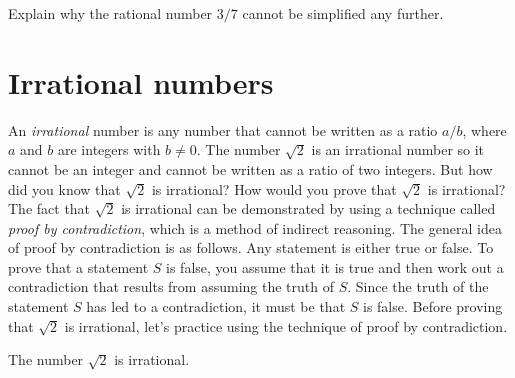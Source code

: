\documentclass[a4paper,oneside,12pt]{article}
\begin{document}
\begin{exercise}
Explain why the rational number $3/7$ cannot be simplified any
further.
\end{exercise}




\section{Irrational numbers}

An \emph{irrational} number is any number that cannot be written as a
ratio $a / b$, where $a$ and $b$ are integers with $b \neq 0$.  The
number $\sqrt{2}$ is an irrational number so it cannot be an integer
and cannot be written as a ratio of two integers.  But how did you
know that $\sqrt{2}$ is irrational?  How would you prove that
$\sqrt{2}$ is irrational?  The fact that $\sqrt{2}$ is irrational can
be demonstrated by using a technique called
\emph{proof by contradiction}, which is a method of indirect
reasoning.  The general idea of proof by contradiction is as follows.
Any statement is either true or false.  To prove that a statement $S$
is false, you assume that it is true and then work out a contradiction
that results from assuming the truth of $S$.  Since the truth of the
statement $S$ has led to a contradiction, it must be that $S$ is
false.  Before proving that $\sqrt{2}$ is irrational, let's practice
using the technique of proof by contradiction.

\begin{theorem}
The number $\sqrt{2}$ is irrational.
\end{theorem}
\end{document}
